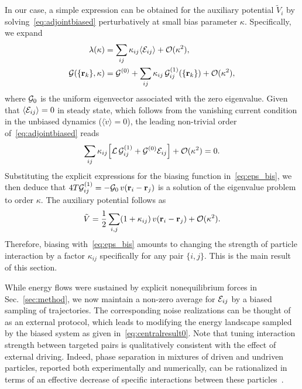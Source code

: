 \documentclass[superscriptaddress, twocolumn, prx, longbibliography, nofootinbib]{revtex4-1}
\begin{document}
In our case, a simple expression can be obtained for the auxiliary potential $\tilde V_i$ by solving~\eqref{eq:adjointbiased} perturbatively at small bias parameter $\kappa$. Specifically, we expand
\begin{equation}
	\begin{aligned}
		\lambda(\kappa) &= \sum_{ij} \kappa_{ij} \langle{\cal E}_{ij}\rangle + {\cal O}(\kappa^2) ,
		\\
		{\cal G}(\{{\bf r}_k\},\kappa) &= {\cal G}^{(0)} + \sum_{ij}\kappa_{ij}\,{\cal G}^{(1)}_{ij}(\{{\bf r}_k\}) + {\cal O}(\kappa^2) ,
	\end{aligned}
\end{equation}
where ${\cal G}_0$ is the uniform eigenvector associated with the zero eigenvalue. Given that $\langle{\cal E}_{ij}\rangle=0$ in steady state, which follows from the vanishing current condition in the unbiased dynamics ($\langle\dot v\rangle=0$), the leading non-trivial order of~\eqref{eq:adjointbiased} reads
\begin{equation}\label{eq:eigenvalue}
	\sum_{ij} \kappa_{ij} \Big[ {\cal L}\, {\cal G}^{(1)}_{ij} + {\cal G}^{(0)} {\cal E}_{ij} \Big] + {\cal O}(\kappa^2) = 0 .
\end{equation}
Substituting the explicit expressions for the biasing function in~\eqref{eq:eps_bis}, we then deduce that $4T{\cal G}^{(1)}_{ij} = -{\cal G}_0\,v({\bf r}_i-{\bf r}_j)$ is a solution of the eigenvalue problem to order $\kappa$. The auxiliary potential follows as
\begin{equation}\label{eq:centralresult0}
	\tilde V = \frac{1}{2}\sum_{i,j} (1+\kappa_{ij})\, v({\bf r}_i-{\bf r}_j) + {\cal O}(\kappa^2) .
\end{equation}
Therefore, biasing with~\eqref{eq:eps_bis} amounts to changing the strength of particle interaction by a factor $\kappa_{ij}$ specifically for any pair $\{i,j\}$. This is the main result of this section.


While energy flows were sustained by explicit nonequilibrium forces in Sec.~\ref{sec:method}, we now maintain a non-zero average for ${\cal E}_{ij}$ by a biased sampling of trajectories. The corresponding noise realizations can be thought of as an external protocol, which leads to modifying the energy landscape sampled by the biased system as given in~\eqref{eq:centralresult0}. Note that tuning interaction strength between targeted pairs is qualitatively consistent with the effect of external driving. Indeed, phase separation in mixtures of driven and undriven particles, reported both experimentally and numerically, can be rationalized in terms of an effective decrease of specific interactions between these particles~\cite{delJunco2018,Han2016}.
\end{document}
